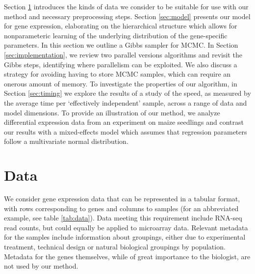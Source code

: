 Section \ref{sec:data} introduces the kinds of data we consider to be suitable for use with our method and necessary preprocessing steps. Section \ref{sec:model} presents our model for gene expression, elaborating on the hierarchical structure which allows for nonparameteric learning of the underlying distribution of the gene-specific parameters. In this section we outline a Gibbs sampler for MCMC. In Section \ref{sec:implementation}, we review two parallel versions algorithms and revisit the Gibbs steps, identifying where parallelism can be exploited. We also discuss a strategy for avoiding having to store MCMC samples, which can require an onerous amount of memory. To investigate the properties of our algorithm, in Section \ref{sec:timing} we explore the results of a study of the speed, as measured by the average time per `effectively independent' sample, across a range of data and model dimensions. To provide an illustration of our method, we analyze differential expression data from an experiment on maize seedlings and contrast our results with a mixed-effects model which assumes that regression parameters follow a multivariate normal distribution.
\section{Data}
\label{sec:data}
We consider gene expression data that can be represented in a tabular format, with rows corresponding to genes and columns to samples (for an abbreviated example, see table \ref{tab:data}). Data meeting this requirement include RNA-seq read counts, but could equally be applied to microarray data. Relevant metadata for the samples include information about groupings, either due to experimental treatment, technical design or natural biological groupings by population. Metadata for the genes themselves, while of great importance to the biologist, are not used by our method.

